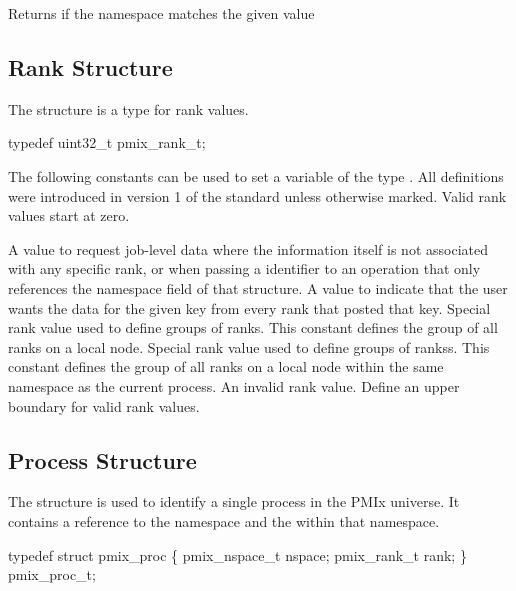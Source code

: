 Returns  if the namespace matches the given value


\subsection{Rank Structure}

The  structure is a  type for rank values.

\cspecificstart
\begin{codepar}
typedef uint32_t pmix_rank_t;
\end{codepar}
\cspecificend

The following constants can be used to set a variable of the type . All definitions were introduced in version 1 of the standard unless otherwise marked. Valid rank values start at zero.

\begin{constantdesc}
%
A value to request job-level data where the information itself is not associated with any specific rank, or when passing a  identifier to an operation that only references the namespace field of that structure.
%
A value to indicate that the user wants the data for the given key from every rank that posted that key.
%
Special rank value used to define groups of ranks.
This constant defines the group of all ranks on a local node.
%
Special rank value used to define groups of rankss.
This constant defines the group of all ranks on a local node within the same namespace as the current process.
%
An invalid rank value.
%
Define an upper boundary for valid rank values.
%
\end{constantdesc}


\subsection{Process Structure}

The  structure is used to identify a single process in the PMIx universe.
It contains a reference to the namespace and the  within that namespace.

\cspecificstart
\begin{codepar}
typedef struct pmix_proc \{
    pmix_nspace_t nspace;
    pmix_rank_t rank;
\} pmix_proc_t;
\end{codepar}
\cspecificend

